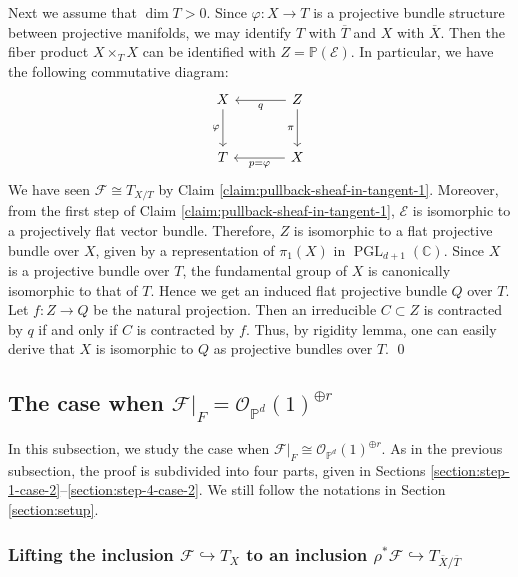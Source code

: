 \documentclass[english,reqno]{amsart}
\newcommand\bbC{{\mathbb C}}
\newcommand\bbP{{\mathbb P}}
\newcommand\sE{{\mathscr E}}
\newcommand\sF{{\mathscr F}}
\newcommand\sO{{\mathscr O}}
\DeclareMathOperator*{\PGL}{PGL}
\theoremstyle{plain}
\theoremstyle{definition}
\numberwithin{equation}{section} %
\begin{document}
Next we assume that $\dim T>0$. Since $\varphi\colon X\rightarrow T$ is a projective bundle structure between projective manifolds, we may identify $T$ with $\overline{T}$ and $X$ with $\overline{X}$. Then the fiber product $X\times_T X$ can be identified with $Z=\bbP(\sE)$. In particular, we have the following commutative diagram:
\[
\begin{tikzcd}[column sep=large, row sep=large]
X\dar[swap]{\varphi} & Z \lar{q}\dar[swap]{\pi} \\
T &
X\lar{p=\varphi}
\end{tikzcd}
\]
We have seen $\sF\cong T_{X/T}$ by Claim \ref{claim:pullback-sheaf-in-tangent-1}. Moreover,  from the first step of Claim \ref{claim:pullback-sheaf-in-tangent-1}, $\sE$ is isomorphic to a projectively flat vector bundle. Therefore, $Z$ is isomorphic to a flat projective bundle over $X$,  given by a representation of $\pi_1(X)$ in $\PGL_{d+1}(\bbC)$.
Since $X$ is a projective bundle over $T$, the fundamental group of $X$ is canonically isomorphic to that of $T$.
Hence we get an induced flat projective bundle $Q$ over $T$. Let $f\colon Z\rightarrow Q$ be the natural projection. Then an irreducible $C\subset Z$ is contracted by $q$ if and only if $C$ is contracted by $f$.  Thus, by rigidity lemma, one can easily derive that $X$ is isomorphic to $Q$ as projective bundles over $T$. 
\hfill \qed











\subsection{The case when $\sF|_F=\sO_{\bbP^d}(1)^{\oplus r}$}
\label{subsection:F=O(1)r}

In this subsection, we  study the case when $\sF\vert_F\cong  \sO_{\bbP^d}(1)^{\oplus r}$.   As in the previous subsection, the proof  is subdivided into four parts, given in Sections \ref{section:step-1-case-2}--\ref{section:step-4-case-2}. We still follow the  notations in Section \ref{section:setup}.

\subsubsection{Lifting the inclusion $\sF\hookrightarrow T_X$ to an inclusion $\rho^*\sF\hookrightarrow T_{\overline{X}/\overline{T}}$}
\end{document}
